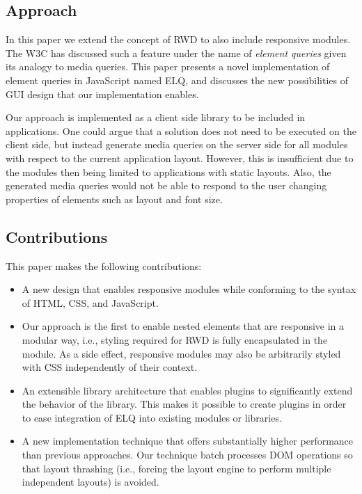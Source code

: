 \documentclass{acm_proc_article-sp}
\newcommand{\elq}{ELQ}
\begin{document}
    \subsection{Approach}
      In this paper we extend the concept of RWD to also include responsive modules.
      The W3C has discussed such a feature under the name of \emph{element queries} given its analogy to media queries.
      This paper presents a novel implementation of element queries in JavaScript named \elq{}, and discusses the new possibilities of GUI design that our implementation enables.

      Our approach is implemented as a client side library to be included in applications.
      One could argue that a solution does not need to be executed on the client side, but instead generate media queries on the server side for all modules with respect to the current application layout.
      However, this is insufficient due to the modules then being limited to applications with static layouts.
      Also, the generated media queries would not be able to respond to the user changing properties of elements such as layout and font size.

    \subsection{Contributions}
      This paper makes the following contributions:
      \begin{itemize}
        \item A new design that enables responsive modules while conforming to the syntax of HTML, CSS, and JavaScript.
        \item
          Our approach is the first to enable nested elements that are responsive in a modular way, i.e., styling required for RWD is fully encapsulated in the module.
          As a side effect, responsive modules may also be arbitrarily styled with CSS independently of their context.
        \item
          An extensible library architecture that enables plugins to significantly extend the behavior of the library.
          This makes it possible to create plugins in order to ease integration of \elq{} into existing modules or libraries.
        \item
          A new implementation technique that offers substantially higher performance than previous approaches.
          Our technique batch processes DOM operations so that layout thrashing (i.e., forcing the layout engine to perform multiple independent layouts) is avoided.
      \end{itemize}
\end{document}
